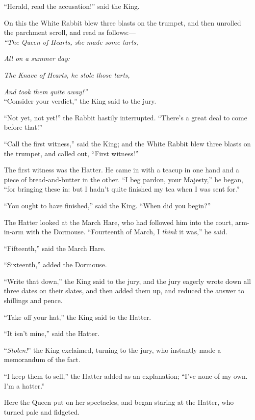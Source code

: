 \documentclass[book, 20pt]{extbook}
\begin{document}
``Herald, read the accusation!'' said the King.

On this the White Rabbit blew three blasts on the trumpet, and then
unrolled the parchment scroll, and read as follows:---\\
\bigskip
\noindent\emph{``The Queen of Hearts, she made some tarts,}

\emph{All on a summer day:\\}

\noindent\emph{The Knave of Hearts, he stole those tarts,}

\emph{And took them quite away!''\\}
\bigskip
``Consider your verdict,'' the King said to the jury.

``Not yet, not yet!'' the Rabbit hastily interrupted. ``There's a great
deal to come before that!''

``Call the first witness,'' said the King; and the White Rabbit blew
three blasts on the trumpet, and called out, ``First witness!''

The first witness was the Hatter. He came in with a teacup in one hand
and a piece of bread-and-butter in the other. ``I beg pardon, your
Majesty,'' he began, ``for bringing these in: but I hadn't quite
finished my tea when I was sent for.''

``You ought to have finished,'' said the King. ``When did you begin?''

The Hatter looked at the March Hare, who had followed him into the
court, arm-in-arm with the Dormouse. ``Fourteenth of March, I
\emph{think} it was,'' he said.

``Fifteenth,'' said the March Hare.

``Sixteenth,'' added the Dormouse.

``Write that down,'' the King said to the jury, and the jury eagerly
wrote down all three dates on their slates, and then added them up, and
reduced the answer to shillings and pence.

``Take off your hat,'' the King said to the Hatter.

``It isn't mine,'' said the Hatter.

``\emph{Stolen!}'' the King exclaimed, turning to the jury, who
instantly made a memorandum of the fact.

``I keep them to sell,'' the Hatter added as an explanation; ``I've none
of my own. I'm a hatter.''

Here the Queen put on her spectacles, and began staring at the Hatter,
who turned pale and fidgeted.
\end{document}
